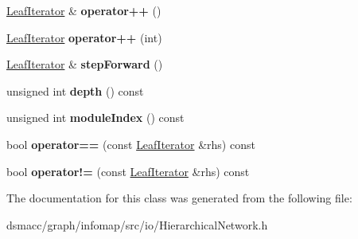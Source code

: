 \begin{DoxyCompactItemize}
\mbox{\hyperlink{classLeafIterator}{Leaf\+Iterator}} \& {\bfseries operator++} ()
\item 
\mbox{\label{classLeafIterator_a4f24c0f1d22bce0e724526ecddea2208}} 
\mbox{\hyperlink{classLeafIterator}{Leaf\+Iterator}} {\bfseries operator++} (int)
\item 
\mbox{\label{classLeafIterator_afc3fc5ead2037ec192da343bae0bc27b}} 
\mbox{\hyperlink{classLeafIterator}{Leaf\+Iterator}} \& {\bfseries step\+Forward} ()
\item 
\mbox{\label{classLeafIterator_a590e8d7e35c28eea4e8e533167903190}} 
unsigned int {\bfseries depth} () const
\item 
\mbox{\label{classLeafIterator_a173a6d490f6ede154b1a8bda8753326b}} 
unsigned int {\bfseries module\+Index} () const
\item 
\mbox{\label{classLeafIterator_a0c531a0cfb66c0f1ecfc88ed36c4c3a0}} 
bool {\bfseries operator==} (const \mbox{\hyperlink{classLeafIterator}{Leaf\+Iterator}} \&rhs) const
\item 
\mbox{\label{classLeafIterator_ac6cf076831f26958b303925a94ed1b6d}} 
bool {\bfseries operator!=} (const \mbox{\hyperlink{classLeafIterator}{Leaf\+Iterator}} \&rhs) const
\end{DoxyCompactItemize}


The documentation for this class was generated from the following file\+:\begin{DoxyCompactItemize}
\item 
dsmacc/graph/infomap/src/io/Hierarchical\+Network.\+h\end{DoxyCompactItemize}
